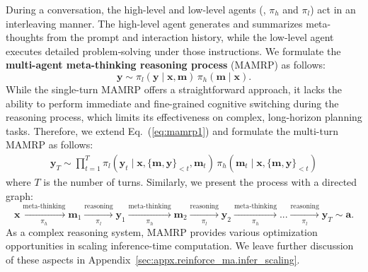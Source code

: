 During a conversation, the high-level and low-level agents (\ie, $\pi_{h}$ and $\pi_{l}$) act in an interleaving manner. 
The high-level agent generates and summarizes meta-thoughts from the prompt and interaction history, while the low-level agent executes detailed problem‐solving under those instructions. We formulate the \textbf{multi-agent meta-thinking reasoning process} (MAMRP) as follows:
\begin{equation}
    \mathbf{y} \sim \pi_l(\mathbf{y}\mid\mathbf{x},\mathbf{m})\, \pi_h(\mathbf{m}\mid\mathbf{x}).
    \label{eq:mamrp1}
\end{equation}
While the single-turn MAMRP offers a straightforward approach, it lacks the ability to perform immediate and fine-grained cognitive switching during the reasoning process, which limits its effectiveness on complex, long-horizon planning tasks.
Therefore, we extend Eq.~(\ref{eq:mamrp1}) and formulate the multi-turn MAMRP as follows:
\begin{align}
    \mathbf{y}_T \sim \prod_{t=1}^{T}
      \pi_l(\mathbf{y}_t\mid\mathbf{x}, \{\mathbf{m, y}\}_{<t}, \mathbf{m}_t)\,
      \pi_h(\mathbf{m}_t\mid\mathbf{x}, \{\mathbf{m, y}\}_{<t})
    \label{eq:mamcp1}
\end{align}
where $T$ is the number of turns. Similarly, we present the process with a directed graph:
\begin{equation}
    \mathbf{x} \xrightarrow[\pi_h]{\text{meta-thinking}} \mathbf{m}_1
    \xrightarrow[\pi_l]{\text{reasoning}} \mathbf{y}_1 
    \xrightarrow[\pi_h]{\text{meta-thinking}} \mathbf{m}_2
    \xrightarrow[\pi_l]{\text{reasoning}} \mathbf{y}_2 
    \xrightarrow[\pi_h]{\text{meta-thinking}} ... 
    \xrightarrow[\pi_l]{\text{reasoning}} \mathbf{y}_T 
    \sim
    \mathbf{a}.
    \label{eq:mamrp2}
\end{equation}
As a complex reasoning system, MAMRP provides various optimization opportunities in scaling inference-time computation. 
We leave further discussion of these aspects in Appendix~\ref{sec:appx.reinforce_ma.infer_scaling}.


